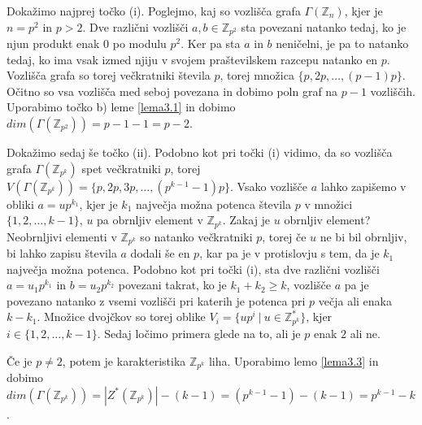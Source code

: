 \documentclass[mat1, tisk]{fmfdelo}
\newcommand{\Z}{\mathbb Z}
\begin{document}
\begin{dokaz}
  Dokažimo najprej točko (i).
  Poglejmo, kaj so vozlišča grafa $\Gamma(\Z_{n})$, kjer je $n = p^2$ in $p > 2$. Dve 
  različni vozlišči $a, b \in \Z_{p^2}$ sta povezani natanko tedaj, ko je njun produkt enak $0$ po modulu 
  $p^2$. Ker pa sta $a$ in $b$ neničelni, je pa to natanko tedaj, ko ima vsak izmed njiju v svojem praštevilskem 
  razcepu natanko en $p$. Vozlišča grafa so torej večkratniki števila $p$, torej množica $\{p,2p,  \ldots, (p-1)p\}$.
  Očitno so vsa vozlišča med seboj povezana in dobimo poln graf na $p-1$ vozliščih. Uporabimo točko b)
  leme \ref{lema3.1} in dobimo $dim(\Gamma(\Z_{p^2})) = p - 1 - 1 = p - 2$.

  Dokažimo sedaj še točko (ii). 
  Podobno kot pri točki (i) vidimo, da so vozlišča grafa 
  $\Gamma(\Z_{p^k})$ spet večkratniki $p$, torej $V(\Gamma(\Z_{p^k})) = \{p,2p, 3p, \ldots, (p^{k-1}-1)p\}$.
  Vsako vozlišče $a$ lahko zapišemo v obliki $a = u p^{k_1}$, kjer je $k_1$ največja možna potenca 
  števila $p$ v množici $\{1, 2, \ldots, k-1\}$, $u$ pa obrnljiv element v $\Z_{p^k}$. Zakaj je $u$ obrnljiv 
  element? Neobrnljivi elementi v $\Z_{p^k}$ so natanko večkratniki $p$, torej če $u$ ne bi bil obrnljiv, bi 
  lahko zapisu števila $a$ dodali še en $p$, kar pa je v protislovju s tem, da je $k_1$ največja možna potenca. 
  Podobno kot pri točki (i), sta dve različni vozlišči $a = u_1 p^{k_1}$ in $b = u_2 p^{k_2}$ povezani takrat, ko je 
  $k_1 + k_2 \geq k$, vozlišče $a$ pa je povezano natanko z vsemi vozlišči pri katerih je potenca pri $p$ 
  večja ali enaka $k - k_1$. 
  Množice dvojčkov so torej oblike $V_i = \{u p^i~|~  u \in  \Z_{p^k}^{*}\}$, kjer $i \in \{1, 2, \ldots, k-1\}$. 
  Sedaj ločimo primera glede na to, ali je $p$ enak $2$ ali ne.

  Če je $p \neq 2$, potem je karakteristika $\Z_{p^k}$ liha. Uporabimo lemo \ref{lema3.3} in dobimo 
  $dim(\Gamma(\Z_{p^k})) = |Z^*(\Z_{p^k})| - (k - 1) = (p^{k-1} - 1) - (k - 1) = p^{k-1} - k$.


\end{dokaz}
\end{document}
